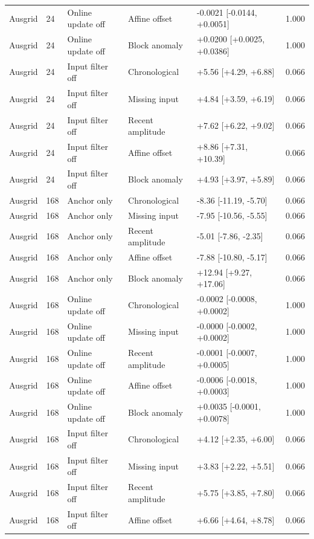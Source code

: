 {\begin{longtable}{lllp{2.5cm}p{4.1cm}r}
Ausgrid & 24 & Online update off & Affine offset & -0.0021 [-0.0144, +0.0051] & 1.000 \\
Ausgrid & 24 & Online update off & Block anomaly & +0.0200 [+0.0025, +0.0386] & 1.000 \\
Ausgrid & 24 & Input filter off & Chronological & +5.56 [+4.29, +6.88] & 0.066 \\
Ausgrid & 24 & Input filter off & Missing input & +4.84 [+3.59, +6.19] & 0.066 \\
Ausgrid & 24 & Input filter off & Recent amplitude & +7.62 [+6.22, +9.02] & 0.066 \\
Ausgrid & 24 & Input filter off & Affine offset & +8.86 [+7.31, +10.39] & 0.066 \\
Ausgrid & 24 & Input filter off & Block anomaly & +4.93 [+3.97, +5.89] & 0.066 \\
Ausgrid & 168 & Anchor only & Chronological & -8.36 [-11.19, -5.70] & 0.066 \\
Ausgrid & 168 & Anchor only & Missing input & -7.95 [-10.56, -5.55] & 0.066 \\
Ausgrid & 168 & Anchor only & Recent amplitude & -5.01 [-7.86, -2.35] & 0.066 \\
Ausgrid & 168 & Anchor only & Affine offset & -7.88 [-10.80, -5.17] & 0.066 \\
Ausgrid & 168 & Anchor only & Block anomaly & +12.94 [+9.27, +17.06] & 0.066 \\
Ausgrid & 168 & Online update off & Chronological & -0.0002 [-0.0008, +0.0002] & 1.000 \\
Ausgrid & 168 & Online update off & Missing input & -0.0000 [-0.0002, +0.0002] & 1.000 \\
Ausgrid & 168 & Online update off & Recent amplitude & -0.0001 [-0.0007, +0.0005] & 1.000 \\
Ausgrid & 168 & Online update off & Affine offset & -0.0006 [-0.0018, +0.0003] & 1.000 \\
Ausgrid & 168 & Online update off & Block anomaly & +0.0035 [-0.0001, +0.0078] & 1.000 \\
Ausgrid & 168 & Input filter off & Chronological & +4.12 [+2.35, +6.00] & 0.066 \\
Ausgrid & 168 & Input filter off & Missing input & +3.83 [+2.22, +5.51] & 0.066 \\
Ausgrid & 168 & Input filter off & Recent amplitude & +5.75 [+3.85, +7.80] & 0.066 \\
Ausgrid & 168 & Input filter off & Affine offset & +6.66 [+4.64, +8.78] & 0.066 \\

\end{longtable}}
